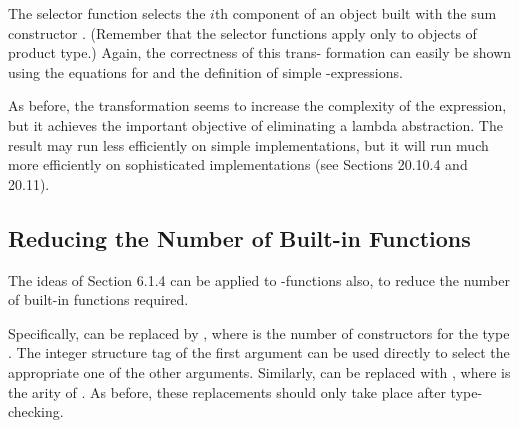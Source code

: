 {

\noindent
The selector function  selects the $i$th component of an object built
with the sum constructor . (Remember that the selector functions 
apply only to objects of product type.) Again, the correctness of this trans-
formation can easily be shown using the equations for  and the
definition of simple -expressions.

As before, the transformation seems to increase the complexity of the
expression, but it achieves the important objective of eliminating a lambda
abstraction. The result may run less efficiently on simple implementations,
but it will run much more efficiently on sophisticated implementations (see
Sections 20.10.4 and 20.11).

\subsection{Reducing the Number of Built-in Functions}
The ideas of Section 6.1.4 can be applied to -functions also, to reduce the
number of built-in functions required.

Specifically,  can be replaced by , where  is the number of
constructors for the type . The integer structure tag of the first argument can
be used directly to select the appropriate one of the other arguments.
Similarly,  can be replaced with , where  is the arity
of . As before, these replacements should only take place after type-checking.

}
